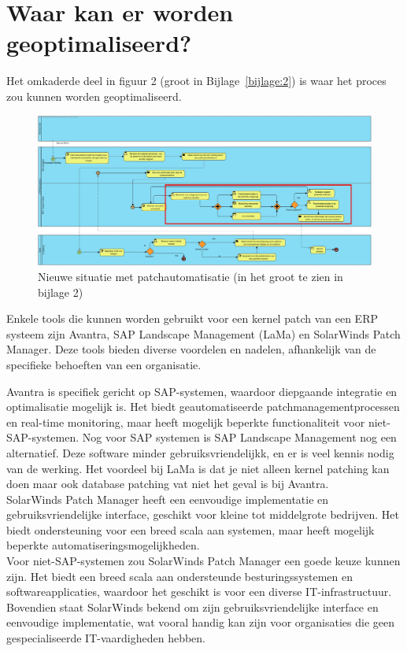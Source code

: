 \documentclass[dutch,dit,thesis]{hogentreport}
\begin{document}
\section{Waar kan er worden geoptimaliseerd?}

Het omkaderde deel in figuur 2 (groot in Bijlage~\ref{bijlage:2}) is waar het proces zou kunnen worden geoptimaliseerd.
 \begin{figure}[htbp]
    \centering
    \includegraphics[width=\textwidth]{huidigesituatie2.png}
    \caption{Nieuwe situatie met patchautomatisatie (in het groot te zien in bijlage 2)}
     \label{fig:huidigesituatie2}
\end{figure}



Enkele tools die kunnen worden gebruikt voor een kernel patch van een ERP systeem zijn Avantra, SAP Landscape Management (LaMa) en SolarWinds Patch Manager. Deze tools bieden diverse voordelen en nadelen, afhankelijk van de specifieke behoeften van een organisatie.

 Avantra is specifiek gericht op SAP-systemen, waardoor diepgaande integratie en optimalisatie mogelijk is. Het biedt geautomatiseerde patchmanagementprocessen en real-time monitoring, maar heeft 
 mogelijk beperkte functionaliteit voor niet-SAP-systemen. Nog voor SAP systemen is SAP Landscape Management nog een alternatief. Deze software minder gebruiksvriendelijkk, en er is veel kennis nodig van de werking. Het voordeel 
 bij LaMa is dat je niet alleen kernel patching kan doen maar ook database patching vat niet het geval is bij Avantra. \\
 SolarWinds Patch Manager heeft een eenvoudige implementatie en gebruiksvriendelijke interface, geschikt voor kleine tot middelgrote bedrijven. Het biedt ondersteuning voor een breed scala aan 
 systemen, maar heeft mogelijk beperkte automatiseringsmogelijkheden. \\


 Voor niet-SAP-systemen zou SolarWinds Patch Manager een goede keuze kunnen zijn. Het biedt een breed scala aan ondersteunde besturingssystemen en softwareapplicaties, waardoor het geschikt is voor
  een diverse IT-infrastructuur. Bovendien staat SolarWinds bekend om zijn gebruiksvriendelijke interface en eenvoudige implementatie, wat vooral handig kan zijn voor organisaties die geen gespecialiseerde IT-vaardigheden hebben.
 
\end{document}
